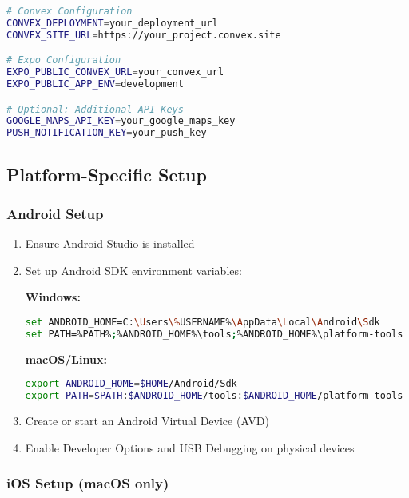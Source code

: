\documentclass[11pt,a4paper]{article}
\begin{document}
\begin{lstlisting}[language=bash]
# Convex Configuration
CONVEX_DEPLOYMENT=your_deployment_url
CONVEX_SITE_URL=https://your_project.convex.site

# Expo Configuration  
EXPO_PUBLIC_CONVEX_URL=your_convex_url
EXPO_PUBLIC_APP_ENV=development

# Optional: Additional API Keys
GOOGLE_MAPS_API_KEY=your_google_maps_key
PUSH_NOTIFICATION_KEY=your_push_key
\end{lstlisting}

\subsection{Platform-Specific Setup}

\subsubsection{Android Setup}

\begin{enumerate}
    \item Ensure Android Studio is installed
    \item Set up Android SDK environment variables:
    
    \textbf{Windows:}
    \begin{lstlisting}[language=bash]
set ANDROID_HOME=C:\Users\%USERNAME%\AppData\Local\Android\Sdk
set PATH=%PATH%;%ANDROID_HOME%\tools;%ANDROID_HOME%\platform-tools
    \end{lstlisting}
    
    \textbf{macOS/Linux:}
    \begin{lstlisting}[language=bash]
export ANDROID_HOME=$HOME/Android/Sdk
export PATH=$PATH:$ANDROID_HOME/tools:$ANDROID_HOME/platform-tools
    \end{lstlisting}
    
    \item Create or start an Android Virtual Device (AVD)
    \item Enable Developer Options and USB Debugging on physical devices
\end{enumerate}

\subsubsection{iOS Setup (macOS only)}
\end{document}
